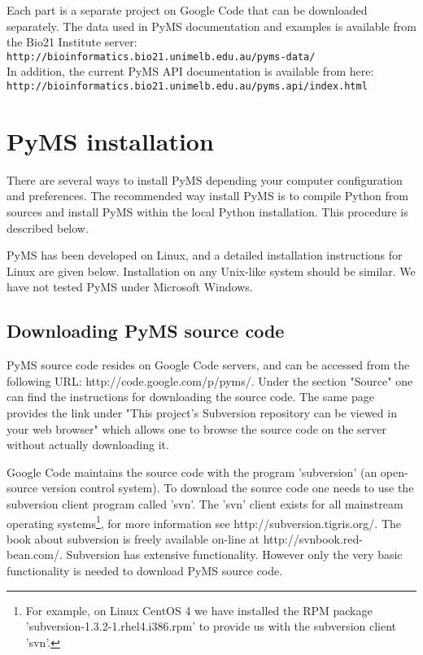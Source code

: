 Each part is a separate project on Google Code that can be downloaded
separately. The data used in PyMS documentation and examples is available
from the Bio21 Institute server:\\
{\tt http://bioinformatics.bio21.unimelb.edu.au/pyms-data/}\\
In addition, the current PyMS API documentation is available from here:\\
{\tt http://bioinformatics.bio21.unimelb.edu.au/pyms.api/index.html}

\section{PyMS installation}

There are several ways to install PyMS depending your computer configuration
and preferences. The recommended way install PyMS is to compile Python
from sources and install PyMS within the local Python installation. This
procedure is described below.

PyMS has been developed on Linux, and a detailed installation instructions
for Linux are given below. Installation on any Unix-like system should be
similar. We have not tested PyMS under Microsoft Windows.

\subsection{Downloading PyMS source code}

PyMS source code resides on Google Code servers, and can be accessed
from the following URL: http://code.google.com/p/pyms/. Under the
section "Source" one can find the instructions for downloading the
source code. The same page provides the link under "This project's
Subversion repository can be viewed in your web browser" which allows
one to browse the source code on the server without actually downloading
it.

Google Code maintains the source code with the program 'subversion'
(an open-source version control system). To download the source code
one needs to use the subversion client program called 'svn'. The 'svn'
client exists for all mainstream operating systems\footnote{For example,
on Linux CentOS 4 we have installed the RPM package
'subversion-1.3.2-1.rhel4.i386.rpm' to provide us with the subversion
client 'svn'.}, for more information see http://subversion.tigris.org/.
The book about subversion is freely available on-line at
http://svnbook.red-bean.com/. Subversion has extensive functionality.
However only the very basic functionality is needed to download PyMS
source code.

